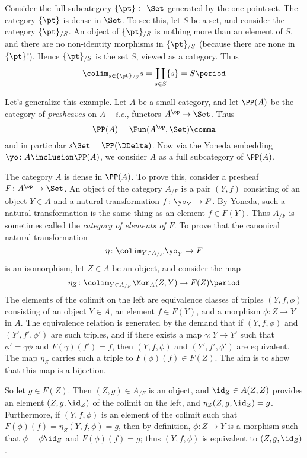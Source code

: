 \begin{eg}
  Consider the full subcategory $\{\pt\} \subset \Set$ generated by the one-point set.
  The category $\{\pt\}$ is dense in $\Set$.
  To see this, let $S$ be a set, and
  consider the category $\{\pt\}_{/S}$.
  An object of $\{\pt\}_{/S}$ is nothing more than an element of $S$,
  and there are no non-identity morphisms in $\{\pt\}_{/S}$ (because there are none in $\{\pt\}$!).
  Hence $\{\pt\}_{/S}$ is the set $S$, viewed as a category.
  Thus
  \[
    \colim_{s \in \{\pt\}_{/S}} s = \coprod_{s \in S} \{s\} = S \period
  \]
\end{eg}

\begin{eg}
  Let's generalize this example.
  Let $A$ be a small category, and let $\PP(A)$ be the category of \emph{presheaves} on $A$ --
  \emph{i.e.}, functors $A^{\op} \to \Set$.
  Thus
  \[
    \PP(A) = \Fun(A^{\op}, \Set) \comma
  \]
  and in particular $s\Set = \PP(\DDelta)$.
  Now via the Yoneda embedding $\yo \colon A \inclusion \PP(A)$, we consider $A$ as a full subcategory of $\PP(A)$.

  The category $A$ is dense in $\PP(A)$.
  To prove this, consider a presheaf $F \colon A^{\op} \to \Set$.
  An object of the category $A_{/F}$ is a pair $(Y,f)$ consisting of an object $Y \in A$ and a natural transformation $f \colon \yo_Y \to F$.
  By Yoneda, such a natural transformation is the same thing as an element $f \in F(Y)$.
  Thus $A_{/F}$ is sometimes called the \emph{category of elements of $F$}.
  To prove that the canonical natural transformation
  \[
    \eta \colon \colim_{Y \in A_{/F}} \yo_Y \to F
  \]
  is an isomorphism, let $Z \in A$ be an object, and consider the map
  \[
    \eta_Z \colon \colim_{Y \in A_{/F}} \Mor_A(Z,Y) \to F(Z) \period
  \]
  The elements of the colimit on the left are equivalence classes of triples $(Y,f,\phi)$ consisting of an object $Y \in A$, an element $f \in F(Y)$, and a morphism $\phi \colon Z \to Y$ in $A$.
  The equivalence relation is generated by the demand that if $(Y,f,\phi)$ and $(Y',f',\phi')$ are such triples, and if there exists a map $\gamma \colon Y \to Y'$ such that $\phi' = \gamma\phi$ and $F(\gamma)(f') = f$, then $(Y,f,\phi)$ and $(Y',f',\phi')$ are equivalent.
  The map $\eta_Z$ carries such a triple to $F(\phi)(f) \in F(Z)$.
  The aim is to show that this map is a bijection.

  So let $g \in F(Z)$.
  Then $(Z,g) \in A_{/F}$ is an object, and $\id_Z \in A(Z,Z)$ provides an element $(Z,g,\id_Z)$ of the colimit on the left, and $\eta_Z(Z,g,\id_Z) = g$.
  Furthermore, if $(Y,f,\phi)$ is an element of the colimit such that $F(\phi)(f) = \eta_Z(Y,f,\phi) = g$, then
  by definition, $\phi \colon Z \to Y$ is a morphism such that $\phi = \phi \id_Z$ and $F(\phi)(f) = g$;
  thus $(Y,f,\phi)$ is equivalent to $(Z,g,\id_Z)$.
\end{eg}

